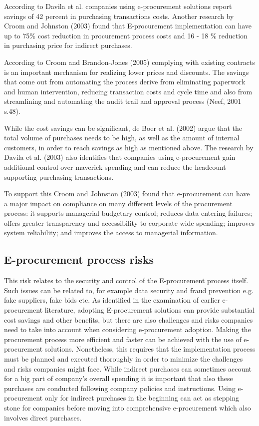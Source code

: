 According to Davila et al. companies using e-procurement solutions report savings of 42 percent in purchasing transactions costs. Another research by Croom and Johnston (2003) found that E-procurement implementation can have up to 75\% cost reduction in procurement process costs and 16 - 18 \% reduction in purchasing price for indirect purchases.

 According to Croom and Brandon-Jones (2005) complying with existing contracts is an important mechanism for realizing lower prices and discounts. The savings that come out from automating the process derive from eliminating paperwork and human intervention, reducing transaction costs and cycle time and also from streamlining and automating the audit trail and approval process (Neef, 2001 s.48).
 
 While the cost savings can be significant, de Boer et al. (2002) argue that the total volume of purchases needs to be high, as well as the amount of internal customers, in order to reach savings as high as mentioned above. 
The research by Davila et al. (2003) also identifies that companies using e-procurement gain additional control over maverick spending and can reduce the headcount supporting purchasing transactions. 

To support this Croom and Johnston (2003) found that e-procurement can have a major impact on compliance on many different levels of the procurement  process: it supports managerial budgetary control; reduces data entering failures; offers greater transparency and accessibility to corporate wide spending; improves system reliability; and improves the access to managerial information.



\subsection{E-procurement process risks}

This risk relates to the security and control of the E-procurement process itself. Such issues can be related to, for example data security and fraud prevention e.g. fake suppliers, fake bids etc.  As identified in the examination of earlier e-procurement literature, adopting E-procurement solutions can provide substantial cost savings and other benefits, but there are also challenges and risks companies need to take into account when considering e-procurement adoption. Making the procurement process more efficient and faster can be achieved with the use of e-procurement solutions. Nonetheless, this requires that the implementation process must be planned and executed thoroughly in order to minimize the challenges and risks companies might face. While indirect purchases can sometimes account for a big part of company's overall spending it is important that also these purchases are conducted following company policies and instructions. Using e-procurement only for indirect purchases in the beginning can act as stepping stone for companies before moving into comprehensive e-procurement which also involves direct purchases.

